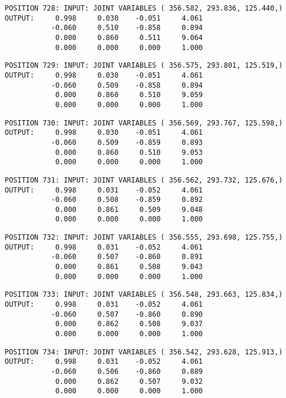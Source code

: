 \begin{verbatim}
POSITION 728: INPUT: JOINT VARIABLES ( 356.582, 293.836, 125.440,)
OUTPUT:     0.998     0.030    -0.051     4.061
           -0.060     0.510    -0.858     0.894
            0.000     0.860     0.511     9.064
            0.000     0.000     0.000     1.000
\end{verbatim} \pagebreak[1]\begin{verbatim}
POSITION 729: INPUT: JOINT VARIABLES ( 356.575, 293.801, 125.519,)
OUTPUT:     0.998     0.030    -0.051     4.061
           -0.060     0.509    -0.858     0.894
            0.000     0.860     0.510     9.059
            0.000     0.000     0.000     1.000
\end{verbatim} \pagebreak[1]\begin{verbatim}
POSITION 730: INPUT: JOINT VARIABLES ( 356.569, 293.767, 125.598,)
OUTPUT:     0.998     0.030    -0.051     4.061
           -0.060     0.509    -0.859     0.893
            0.000     0.860     0.510     9.053
            0.000     0.000     0.000     1.000
\end{verbatim} \pagebreak[1]\begin{verbatim}
POSITION 731: INPUT: JOINT VARIABLES ( 356.562, 293.732, 125.676,)
OUTPUT:     0.998     0.031    -0.052     4.061
           -0.060     0.508    -0.859     0.892
            0.000     0.861     0.509     9.048
            0.000     0.000     0.000     1.000
\end{verbatim} \pagebreak[1]\begin{verbatim}
POSITION 732: INPUT: JOINT VARIABLES ( 356.555, 293.698, 125.755,)
OUTPUT:     0.998     0.031    -0.052     4.061
           -0.060     0.507    -0.860     0.891
            0.000     0.861     0.508     9.043
            0.000     0.000     0.000     1.000
\end{verbatim} \pagebreak[1]\begin{verbatim}
POSITION 733: INPUT: JOINT VARIABLES ( 356.548, 293.663, 125.834,)
OUTPUT:     0.998     0.031    -0.052     4.061
           -0.060     0.507    -0.860     0.890
            0.000     0.862     0.508     9.037
            0.000     0.000     0.000     1.000
\end{verbatim} \pagebreak[1]\begin{verbatim}
POSITION 734: INPUT: JOINT VARIABLES ( 356.542, 293.628, 125.913,)
OUTPUT:     0.998     0.031    -0.052     4.061
           -0.060     0.506    -0.860     0.889
            0.000     0.862     0.507     9.032
            0.000     0.000     0.000     1.000
\end{verbatim} \pagebreak[1]\begin{verbatim}

\end{verbatim}
